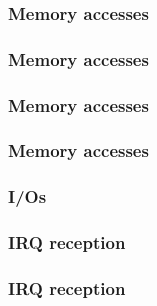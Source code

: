 
\begin{frame}
  \frametitle{Memory accesses}

  \begin{center}
  \end{center}

\end{frame}


\begin{frame}
  \frametitle{Memory accesses}

  \begin{center}
  \end{center}

\end{frame}


\begin{frame}
  \frametitle{Memory accesses}

  \begin{center}
  \end{center}

\end{frame}


\begin{frame}
  \frametitle{Memory accesses}

  \begin{center}
  \end{center}

\end{frame}


\begin{frame}
  \frametitle{I/Os}

\end{frame}


\begin{frame}
  \frametitle{IRQ reception}

  \begin{center}
  \end{center}

\end{frame}


\begin{frame}
  \frametitle{IRQ reception}

  \begin{center}
  \end{center}

\end{frame}

